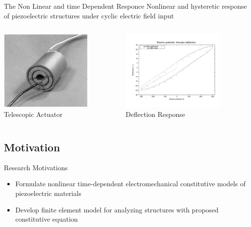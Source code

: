 \documentclass{beamer}
\begin{document}
\begin{frame}{The Non Linear and time Dependent Responce}
Nonlinear and hysteretic response of piezoelectric structures under cyclic
electric field input

\begin{columns}[t]
     \begin{column}[T]{5cm}
     \includegraphics[height=4cm]{../images/telescpic_actuator_picture}\\ 
Telescopic Actuator \cite{Berner1999} 
     \end{column}
     \begin{column}[T]{5cm} %
      \includegraphics[height=4cm]{../images/result_pzt_586.pdf}\\
      Deflection Response
     \end{column}
     \end{columns}    
\end{frame}

\subsection{Motivation}

\begin{frame}{Research Motivations}
\begin{itemize}\itemsep2ex

\item	Formulate nonlinear time-dependent electromechanical constitutive models
of piezoelectric materials
\item	Develop finite element model for analyzing structures with proposed
constitutive equation

\end{itemize}     
\end{frame}
 
\end{document}
